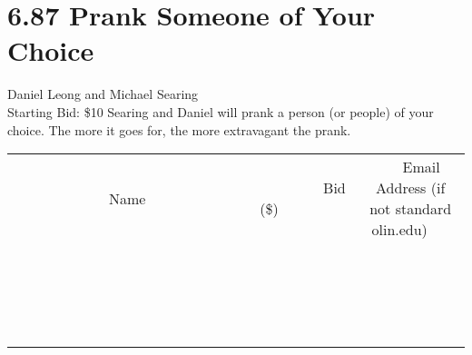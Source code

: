 \documentclass[11pt]{article}
\begin{document}
\section*{6.87 Prank Someone of Your Choice}
Daniel Leong and Michael Searing
\\
Starting Bid: \$10
\newline
Searing and Daniel will prank a person (or people) of your choice. The more it goes for, the more extravagant the prank.
\\[3ex]
\begin{tabular}{c c c}
~~~~~~~~~~~~~Name~~~~~~~~~~~~~ & ~~~~~~~~~Bid (\$)~~~~~~~~~  & ~~~Email Address (if not standard olin.edu)~~~\\
 & & \\
\hline
 & & \\
\hline
 & & \\
\hline
 & & \\
\hline
 & & \\
\hline
 & & \\
\hline
 & & \\
\hline
 & & \\
\hline
 & & \\
\hline
 & & \\
\hline
 & & \\
\hline
 & & \\
\hline
 & & \\
\hline
 & & \\
\hline
 & & \\
\hline
 & & \\
\hline
 & & \\
\hline
 & & \\
\hline
 & & \\
\hline
\end{tabular}
\newpage
\end{document}
